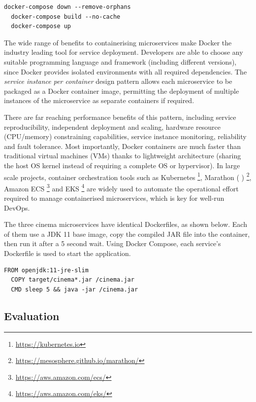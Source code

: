 \begin{lstlisting}[caption=Sample Docker Compose commands to start the microservices]
  docker-compose down --remove-orphans
  docker-compose build --no-cache
  docker-compose up
\end{lstlisting}

The wide range of benefits to containerising microservices make Docker the industry leading tool for service deployment. Developers are able to choose any suitable programming language and framework (including different versions), since Docker provides isolated environments with all required dependencies. The \textit{service instance per container} design pattern allows each microservice to be packaged as a Docker container image, permitting the deployment of multiple instances of the microservice as separate containers if required.

There are far reaching performance benefits of this pattern, including service reproducibility, independent deployment and scaling, hardware resource (CPU/memory) constraining capabilities, service instance monitoring, reliability and fault tolerance. Most importantly, Docker containers are much faster than traditional virtual machines (VMs) thanks to lightweight architecture (sharing the host OS kernel instead of requiring a complete OS or hypervisor). In large scale projects, container orchestration tools such as Kubernetes \footnote{\url{https://kubernetes.io}}, Marathon (  ) \footnote{\url{https://mesosphere.github.io/marathon/}}, Amazon ECS \footnote{\url{https://aws.amazon.com/ecs/}} and EKS \footnote{\url{https://aws.amazon.com/eks/}} are widely used to automate the operational effort required to manage containerised microservices, which is key for well-run DevOps.

The three cinema microservices have identical Dockerfiles, as shown below. Each of them use a JDK 11 base image, copy the compiled JAR file into the container, then run it after a 5 second wait. Using Docker Compose, each service's Dockerfile is used to start the application.

\begin{lstlisting}[caption=Dockerfile for cinema services]
  FROM openjdk:11-jre-slim
  COPY target/cinema*.jar /cinema.jar
  CMD sleep 5 && java -jar /cinema.jar
\end{lstlisting}


\subsection{Evaluation}
